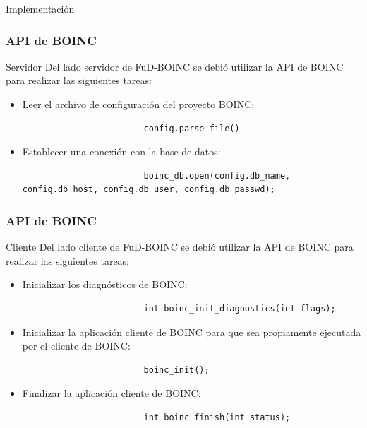 \begin{subsection}{Implementación}

	\begin{frame}[fragile]\frametitle{API de BOINC}
		\begin{block}{Servidor}
			Del lado servidor de FuD-BOINC se debió utilizar la API de BOINC para realizar las siguientes tareas:
			\vspace{1mm}
			\begin{itemize}
				\item Leer el archivo de configuración del proyecto BOINC:
					\begin{lstlisting}
						config.parse_file()
					\end{lstlisting}
				\item Establecer una conexión con la base de datos:
					\begin{lstlisting}
						boinc_db.open(config.db_name, config.db_host, config.db_user, config.db_passwd);
					\end{lstlisting}
			\end{itemize}
		\end{block}
	\end{frame}

	\begin{frame}[fragile]\frametitle{API de BOINC}
		\begin{block}{Cliente}
			Del lado cliente de FuD-BOINC se debió utilizar la API de BOINC para realizar las siguientes tareas:
			\vspace{2mm}
			\begin{itemize}
				\item Inicializar los diagnósticos de BOINC:
					\begin{lstlisting}
						int boinc_init_diagnostics(int flags);
					\end{lstlisting}
				\item Inicializar la aplicación cliente de BOINC para que sea propiamente ejecutada por el cliente de BOINC:
					\begin{lstlisting}
						boinc_init();
          			\end{lstlisting}
				\item Finalizar la aplicación cliente de BOINC:
         			\begin{lstlisting}
						int boinc_finish(int status);
          			\end{lstlisting}
    		\end{itemize}
  		\end{block}
	\end{frame}


\end{subsection}
